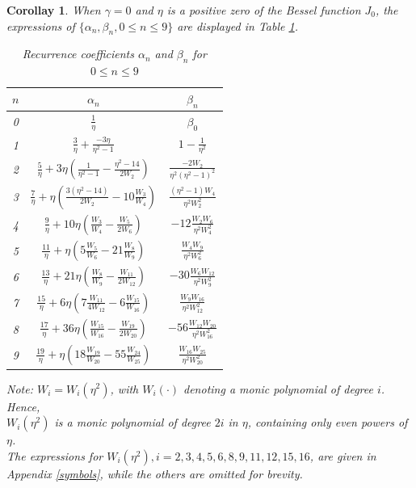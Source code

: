 \documentclass[11pt,a4paper]{article}
\newtheorem{corollary}[theorem]{Corollay}
\numberwithin{equation}{section}
\begin{document}
\begin{corollary}\label{cor0}
When $\gamma=0$ and $\eta$ is a positive zero of the Bessel function $J_0$, the expressions of $\{\alpha_{n}, \beta_n,0\leq n\leq9\}$ are displayed in Table \ref{tab1:rec-coeffs}.
		\begin{table}[H]
			\centering
			 \renewcommand{\arraystretch}{1.5}
			 \setlength{\tabcolsep}{3pt}
\caption{Recurrence coefficients $\alpha_{n}$ and $\beta_{n}$ for $0\leq n\leq9$}
			\label{tab1:rec-coeffs}
\begin{tabular}{|c|c|c|}
\hline
$n$ & $\alpha_n$ & $\beta_n$   \\
\hline
0 & $\frac{1}{\eta}$ & $\beta_0$ \\
\hline
1 & $\frac{3}{\eta}+\frac{-3\eta}{\eta^2-1}$ & $1-\frac{1}{\eta^2}$  \\
\hline
2 & $\frac{5}{\eta}+3\eta\left(\frac{1}{\eta^2-1}-\frac{\eta^2-14}{2W_2}\right)$ & $\frac{-2W_2}{\eta^2(\eta^2-1)^2}$ \\
\hline
3 & $\frac{7}{\eta}+\eta\left(\frac{3(\eta^2-14)}{2W_2}-10\frac{ W_3}{W_4}\right)$ & $\frac{(\eta^2-1)W_4}{\eta^2W_2^2}$ \\
\hline
4 & $\frac{9}{\eta}+10\eta\left(\frac{W_3}{W_4}-\frac{W_5}{2W_6}\right)$ & $-12\frac{W_2W_6}{\eta^2W_4^2}$ \\
\hline
5 & $\frac{11}{\eta}+\eta\left(5\frac{W_5}{W_6}-21\frac{W_{8}}{W_{9}}\right)$ & $\frac{W_4W_9}{\eta^2W_6^2}$ \\
\hline
6 & $\frac{13}{\eta}+21\eta\left(\frac{W_{8}}{W_{9}}-\frac{W_{11}}{2W_{12}}\right)$ & $-30\frac{W_6W_{12}}{\eta^2W_9^2}$ \\
\hline
7 & $\frac{15}{\eta}+6\eta\left(7\frac{W_{11}}{4W_{12}}-6\frac{W_{15}}{W_{16}}\right)$ & $\frac{W_9W_{16}}{\eta^2W_{12}^2}$ \\
\hline
8&$\frac{17}{\eta}+36\eta\left(\frac{W_{15}}{W_{16}}-\frac{W_{19}}{2W_{20}}\right)$&$-56\frac{W_{12}W_{20}}{\eta^2W_{16}^2}$\\
\hline
9&$\frac{19}{\eta}+\eta\left(18\frac{W_{19}}{W_{20}}-55\frac{W_{24}}{W_{25}}\right)$&$\frac{W_{16}W_{25}}{\eta^2W_{20}^2}$\\
\hline
\end{tabular}
\par {\small Note: $W_i=W_i(\eta^2)$, with $W_i(\cdot)$ denoting a monic polynomial of degree $i$. Hence,\\ $W_i(\eta^2)$ is a monic polynomial of degree $2i$ in $\eta$, containing only even powers of $\eta$.\\ The expressions for $W_i(\eta^2), i=2,3,4,5,6,8,9,11,12,15,16$, are given in \\Appendix \ref{symbols}, while the others are omitted for brevity.}
\end{table}
		
\end{corollary}
\end{document}
